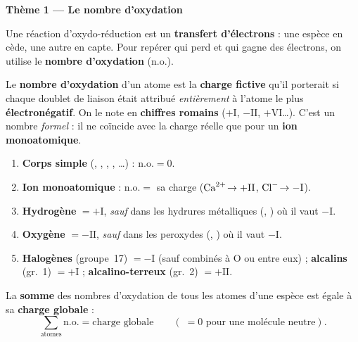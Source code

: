 \documentclass[11pt,a4paper]{article}
\begin{document}
\begin{center}\color{primarydark}\Large\bfseries Thème 1 — Le nombre d'oxydation\end{center}

Une réaction d'oxydo-réduction est un \textbf{transfert d'électrons} : une espèce en cède, une
autre en capte. Pour repérer qui perd et qui gagne des électrons, on utilise le \textbf{nombre
d'oxydation} (n.o.).

\begin{cle}
Le \textbf{nombre d'oxydation} d'un atome est la \textbf{charge fictive} qu'il porterait si chaque
doublet de liaison était attribué \emph{entièrement} à l'atome le plus \textbf{électronégatif}. On le
note en \textbf{chiffres romains} ($+\mathrm{I}$, $-\mathrm{II}$, $+\mathrm{VI}$\ldots). C'est un
nombre \emph{formel} : il ne coïncide avec la charge réelle que pour un \textbf{ion monoatomique}.
\end{cle}

\begin{cle}
\begin{enumerate}[label=\textbf{\arabic*.},leftmargin=2.0em,topsep=1pt,itemsep=1pt]
  \item \textbf{Corps simple} (, , , , \ldots) : $\mathrm{n.o.}=0$.
  \item \textbf{Ion monoatomique} : $\mathrm{n.o.}=$ sa charge
        ($\ce{Ca^{2+}}\!\to +\mathrm{II}$, $\ce{Cl^-}\!\to -\mathrm{I}$).
  \item \textbf{Hydrogène} $=+\mathrm{I}$, \emph{sauf} dans les hydrures métalliques
        (, ) où il vaut $-\mathrm{I}$.
  \item \textbf{Oxygène} $=-\mathrm{II}$, \emph{sauf} dans les peroxydes (, )
        où il vaut $-\mathrm{I}$.
  \item \textbf{Halogènes} (groupe~17) $=-\mathrm{I}$ (sauf combinés à O ou entre eux) ;
        \textbf{alcalins} (gr.~1) $=+\mathrm{I}$ ; \textbf{alcalino-terreux} (gr.~2) $=+\mathrm{II}$.
\end{enumerate}
\end{cle}

\begin{cle}
La \textbf{somme} des nombres d'oxydation de tous les atomes d'une espèce est égale à sa
\textbf{charge globale} :
\[
\sum_{\text{atomes}}\mathrm{n.o.}=\text{charge globale}\qquad(\;=0\text{ pour une molécule neutre}).
\]
\end{cle}
\end{document}
